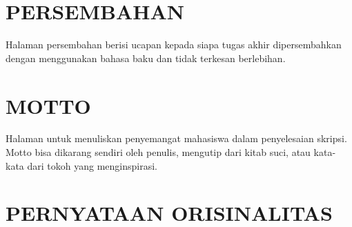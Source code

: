 \documentclass[12pt, a4paper, onecolumn, oneside]{report}
\begin{document}
    
    
    
    
    

\cleardoublepage
\chapter*{PERSEMBAHAN}
Halaman persembahan berisi ucapan kepada siapa tugas akhir dipersembahkan dengan menggunakan bahasa baku dan tidak terkesan berlebihan.

\chapter*{MOTTO}
Halaman untuk menuliskan penyemangat mahasiswa dalam penyelesaian skripsi. Motto bisa dikarang sendiri oleh penulis, mengutip dari kitab suci, atau kata-kata dari tokoh yang menginspirasi.


\cleardoublepage
\chapter*{PERNYATAAN ORISINALITAS}
\end{document}
